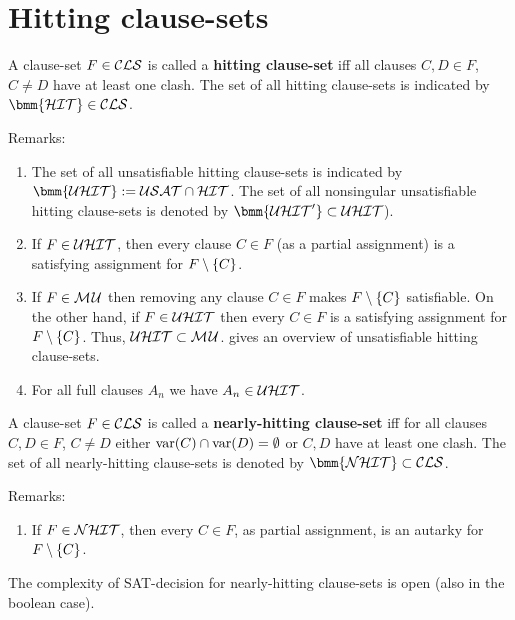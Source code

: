 \documentclass{report}
\begin{document}
\section{Hitting clause-sets}
\label{sec:hit}

\begin{defi}\label{def:hit-cls}
A clause-set $F \in \mathcal{CLS} $ is called a \textbf{hitting clause-set} iff all clauses $C,D \in F$, $C \not = D$ have at least one clash. The set of all hitting clause-sets is indicated by $\bmm{\Clash} \in \Cls$.
\end{defi}
Remarks:
  \begin{enumerate}
  \item The set of all unsatisfiable hitting clause-sets is indicated by $\bmm{\Uclash} := \Usat \cap \Clash$. The set of all nonsingular unsatisfiable hitting clause-sets is denoted by $\bmm{\Uclash'} \subset \Uclash$).
  \item If $F \in \mathcal{U}\mathcal{HIT}$, then every clause $C \in F$ (as a partial assignment) is a satisfying assignment for $F \setminus \{ C \}$.
  \item If $F \in \mathcal{M\hspace{0.8pt}U}$ then removing any clause $C \in F$ makes $F \setminus \{ C \}$ satisfiable. On the other hand, if $F \in \mathcal{U}\mathcal{HIT}$ then every $C \in F$ is a satisfying assignment for $F \setminus \{ C \}$. Thus, $\mathcal{U}\mathcal{HIT} \subset \mathcal{M\hspace{0.8pt}U}$. \cite{KullmannZhao2016UHitSAT} gives an overview of unsatisfiable hitting clause-sets.
  \item For all full clauses $A_n$ we have $A_n \in \mathcal{U}\mathcal{HIT}$.
  \end{enumerate}

 \begin{defi}\label{def:nhit-cls}
A clause-set $F \in \mathcal{CLS} $ is called a \textbf{nearly-hitting clause-set} iff for all clauses $C,D \in F$, $C \not = D$ either $\operatorname{var}(C) \cap \operatorname{var}(D) = \emptyset$ or $C,D$ have at least one clash. The set of all nearly-hitting clause-sets is denoted by $\bmm{\Nclash} \subset \Cls$.
\end{defi}
Remarks:
  \begin{enumerate}
  \item If $F \in \mathcal{NHIT}$, then every $C \in F$, as partial assignment, is an autarky for $F \setminus \{ C \}$.
  \end{enumerate}
  
\begin{quest}\label{ques:nhit-sat}
The complexity of SAT-decision for nearly-hitting clause-sets is open (also in the boolean case).
\end{quest}   
\end{document}
